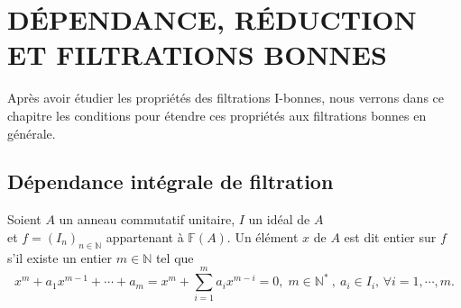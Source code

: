 \chapter{DÉPENDANCE, RÉDUCTION ET FILTRATIONS BONNES}

Après avoir étudier les propriétés des filtrations I-bonnes, nous verrons dans ce chapitre les conditions pour étendre ces propriétés aux filtrations bonnes en générale.
\section{Dépendance intégrale de filtration}
\begin{madefinition}
	Soient $A$ un anneau commutatif unitaire, $I$ un idéal de $A$\\
	et $f=(I_n)_{n\in \mathbb{N}} $ appartenant à $ \mathbb{F}(A)$. Un élément $x$ de $A$ est dit entier sur $f$ s'il existe un entier $m \in \mathbb{N}$ tel que 
	\[ 	x^m + a_1 x^{m-1} + \cdots + a_m = x^m + \sum_{i=1}^{m} a_i x^{m-i} = 0, \; m \in \mathbb{N^*} \ , \ a_i \in I_i,\, \forall i=1, \cdots ,m. \]	
\end{madefinition}
